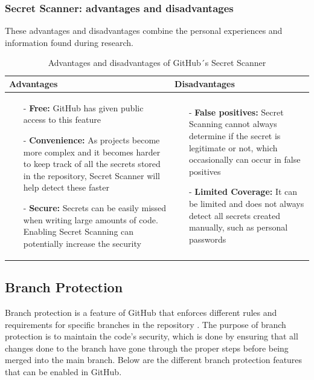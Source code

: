 \subsubsection{Secret Scanner: advantages and disadvantages}
These advantages and disadvantages combine the personal experiences and information found during research. 
\begin{table}[H]
\centering
\begin{tabular}{|>{\raggedright\arraybackslash}p{6cm}|>{\raggedright\arraybackslash}p{6cm}|}
\hline
\textbf{Advantages} & \textbf{Disadvantages} \\
\hline
\begin{itemize}
\item [-] \textbf{Free:} GitHub has given public access to this feature 
\vspace{5pt}
\item [-]\textbf{Convenience:} As projects become more complex and it becomes harder to keep track of all the secrets stored in the repository, Secret Scanner will help detect these faster 
\vspace{5pt}
\item [-] \textbf{Secure:} Secrets can be easily missed when writing large amounts of code. Enabling Secret Scanning can potentially increase the security 
\end{itemize}
&
   \begin{itemize}
\item [-] \textbf{False positives:} Secret Scanning cannot always determine if the secret is legitimate or not, which occasionally can occur in false positives
\vspace{5pt}
\item [-] \textbf{Limited Coverage:} It can be limited and does not always detect all secrets created manually, such as personal passwords 
    \end{itemize}
    \\
    \hline
    \end{tabular}
    \caption{Advantages and disadvantages of GitHub´s Secret Scanner}\cite{Secret_Scanner_pros_cons}
    \label{tab: Secret_Scanner}
    \end{table}
    
\newpage
\subsection{Branch Protection}
\label{branchprotection}
Branch protection is a feature of GitHub that enforces different rules and requirements for specific branches in the repository \cite{ProtectedBranches}. The purpose of branch protection is to maintain the code's security, which is done by ensuring that all changes done to the branch have gone through the proper steps before being merged into the main branch. Below are the different branch protection features that can be enabled in GitHub. 

